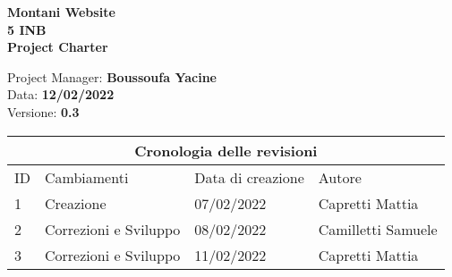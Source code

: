 \documentclass{article}
\begin{document}
	

	

	\begin{titlepage}

		\begin{center}

			\huge\textbf{Montani Website}\\

			\Large\textbf{5 INB}\\

			\Large \textbf{Project Charter}\\

			\vspace{4cm}

			\large Project Manager: \textbf{Boussoufa Yacine}\\

			\large Data: \textbf{12/02/2022}\\

			\large Versione: \textbf{0.3}\\

		\end{center}

	\end{titlepage}

	

	\clearpage

	

	\begin{tabular}{ |p{1cm}|p{4cm}|p{3cm}|p{2cm}|  }

		\hline

		\multicolumn{4}{|c|}{Cronologia delle revisioni} \\

		\hline

		ID& Cambiamenti &Data di creazione&Autore\\

		\hline

		1   & Creazione    &07/02/2022&   Capretti Mattia\\

		\hline

		2   & Correzioni e Sviluppo    &08/02/2022&   Camilletti Samuele\\

		\hline

		3   & Correzioni e Sviluppo    &11/02/2022&   Capretti Mattia\\

		\hline

	\end{tabular}
\end{document}
